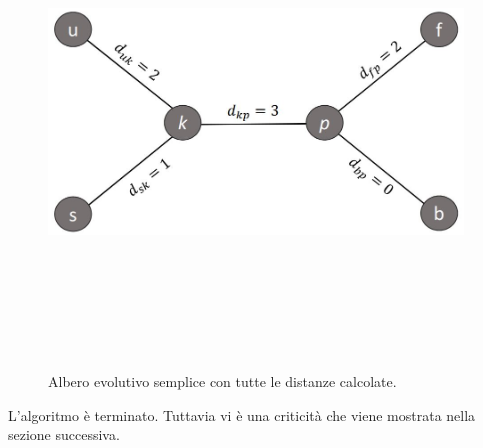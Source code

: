 \begin{figure}[h!]
\centering
	\includegraphics[height=13cm, width=11cm, keepaspectratio]{distance_between_s_u_part_4.jpg}
 	\caption{Albero evolutivo semplice con tutte le distanze calcolate.}
  	\label{fig:neighborsleaves_4}
\end{figure}
\newline
L'algoritmo è terminato. Tuttavia vi è una criticità che viene mostrata nella sezione successiva.

